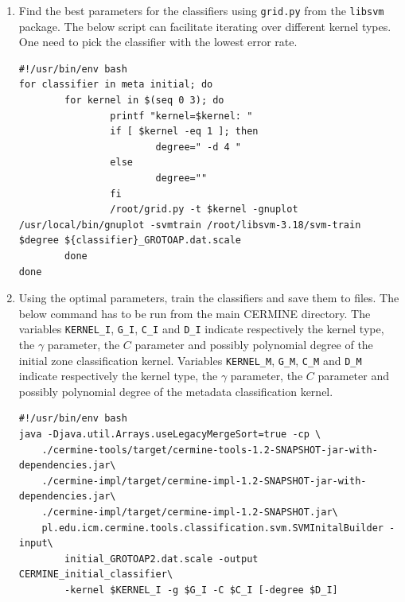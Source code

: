 \begin{appendix}
\begin{enumerate}
\begin{lstlisting}
\end{lstlisting}
\item Find the best parameters for the classifiers using \verb+grid.py+ from the \verb+libsvm+ package. The below script can facilitate iterating over different kernel types. One need to pick the classifier with the lowest error rate.
\begin{lstlisting}
#!/usr/bin/env bash
for classifier in meta initial; do
        for kernel in $(seq 0 3); do
                printf "kernel=$kernel: "
                if [ $kernel -eq 1 ]; then
                        degree=" -d 4 "
                else
                        degree=""
                fi
                /root/grid.py -t $kernel -gnuplot /usr/local/bin/gnuplot -svmtrain /root/libsvm-3.18/svm-train $degree ${classifier}_GROTOAP.dat.scale
        done
done
\end{lstlisting}
\item Using the optimal parameters, train the classifiers and save them to files. The below command has to be run from the main CERMINE directory. The variables \verb+KERNEL_I+, \verb+G_I+, \verb+C_I+ and \verb+D_I+ indicate respectively the kernel type, the $\gamma$ parameter, the $C$ parameter and possibly polynomial degree of the initial zone classification kernel. Variables \verb+KERNEL_M+, \verb+G_M+, \verb+C_M+ and \verb+D_M+ indicate respectively the kernel type, the $\gamma$ parameter, the $C$ parameter and possibly polynomial degree of the metadata classification kernel.
\begin{lstlisting}
#!/usr/bin/env bash
java -Djava.util.Arrays.useLegacyMergeSort=true -cp \
    ./cermine-tools/target/cermine-tools-1.2-SNAPSHOT-jar-with-dependencies.jar\
    ./cermine-impl/target/cermine-impl-1.2-SNAPSHOT-jar-with-dependencies.jar\
    ./cermine-impl/target/cermine-impl-1.2-SNAPSHOT.jar\
    pl.edu.icm.cermine.tools.classification.svm.SVMInitalBuilder -input\
        initial_GROTOAP2.dat.scale -output CERMINE_initial_classifier\
        -kernel $KERNEL_I -g $G_I -C $C_I [-degree $D_I]


\end{lstlisting}
\end{enumerate}
\end{appendix}
